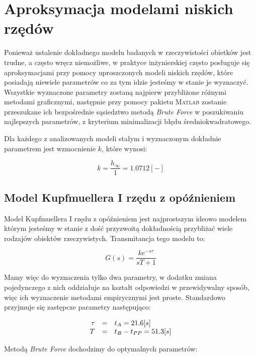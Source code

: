 \documentclass[12pt]{article}
\begin{document}
\section{Aproksymacja modelami niskich rzędów}

Ponieważ ustalenie dokładnego modelu badanych w rzeczywistości obietków jest
trudne, a często wręcz niemożliwe, w praktyce inżynierskiej często posługuje się
aproksymacjami przy pomocy uproszczonych modeli niskich rzędów, które posiadają
niewiele parametrów co za tym idzie jesteśmy w stanie je wyznaczyć. Wszystkie
wyznaczone parametry zostaną najpierw przybliżone różnymi metodami graficznymi,
następnie przy pomocy pakietu \textsc{Matlab} zostanie przeszukane ich
bezpośrednie sąsiedztwo metodą \textit{Brute Force} w poszukiwaniu najlepszych
parametrów, z kryterium minimalizacji błędu średniokwadratowego.

Dla każdego z analizowanych modeli stałym i wyznaczonym dokładnie parametrem
jest wzmocnienie $k$, które wynosi:

\begin{equation*}
	k=\frac{h_{\infty}}{1}=1.0712[-]
\end{equation*}
\subsection{Model Kupfmuellera I rzędu z opóźnieniem}

Model Kupfmuellera I rzędu z opóźnieniem jest najprostszym ideowo modelem którym
jesteśmy w stanie z dość przyzwoitą dokładnością przybliżać wiele rodzajów
obiektów rzeczywistych. Transmitancja tego modelu to:

\begin{equation}
	G(s)=\dfrac{ke^{-s\tau}}{sT+1}
	\label{equ:trankup1}
\end{equation}

Mamy więc do wyznaczenia tylko dwa parametry, w dodatku zmiana pojedynczego z
nich oddziałuje na kształt odpowiedzi w przewidywalny sposób, więc ich
wyznaczenie metodami empirycznymi jest proste. Standardowo przyjmuje się
zastępcze parametry następująco:

\begin{equation*}
\begin{array}{r c l}
	\tau&=&t_A=21.6[s] \\
	T&=&t_B-t_{PP}=51.3[s] 
\end{array}
\end{equation*}

Metodą \textit{Brute Force} dochodzimy do optymalnych parametrów:
\end{document}

